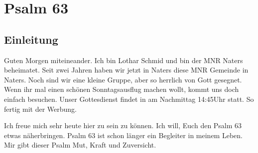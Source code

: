 \documentclass[14pt]{../../inc/mybib}
\author{Lothar Schmid}
\begin{document}
\setlength{\baselineskip}{1.5\baselineskip}

\section*{Psalm 63}
    \subsection{Einleitung}
    Guten Morgen miteineander. Ich bin Lothar Schmid und bin der MNR Naters beheimatet. Seit zwei Jahren haben wir jetzt in Naters diese MNR Gemeinde in Naters. Noch sind wir eine kleine Gruppe, aber so herrlich von Gott gesegnet. Wenn ihr mal einen schönen Sonntagsausflug machen wollt, kommt uns doch einfach besuchen. Unser Gottesdienst findet in am Nachmittag 14:45Uhr statt. So fertig mit der Werbung.
    
    Ich freue mich sehr heute hier zu sein zu können. Ich will, Euch den Psalm 63 etwas näherbringen. Psalm 63 ist schon länger ein Begleiter in meinem Leben. Mir gibt dieser Psalm Mut, Kraft und Zuversicht. 
\end{document}
